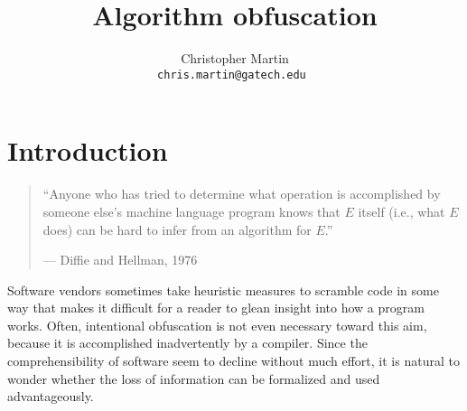 \documentclass[10pt,twocolumn]{article}
\title{Algorithm obfuscation}
\date{}
\author{
  \begin{tabular}{c c c}
    Christopher Martin \\
    \small \tt{chris.martin@gatech.edu}
  \end{tabular}
}
\begin{document}
  \thispagestyle{empty}


  \section{Introduction}

    \begin{quote}
      ``Anyone who has tried to determine what operation is accomplished by someone else's machine language
      program knows that $E$ itself (i.e., what $E$ does) can be hard to infer from an algorithm for $E$.''

      \hfill --- Diffie and Hellman, 1976 \cite{newDirections}
    \end{quote}

    Software vendors sometimes take heuristic measures to scramble code in some way that makes it
    difficult for a reader to glean insight into how a program works. Often, intentional obfuscation
    is not even necessary toward this aim, because it is accomplished inadvertently by a compiler.
    Since the comprehensibility of software seem to decline without much effort, it is natural to
    wonder whether the loss of information can be formalized and used advantageously.
\end{document}
